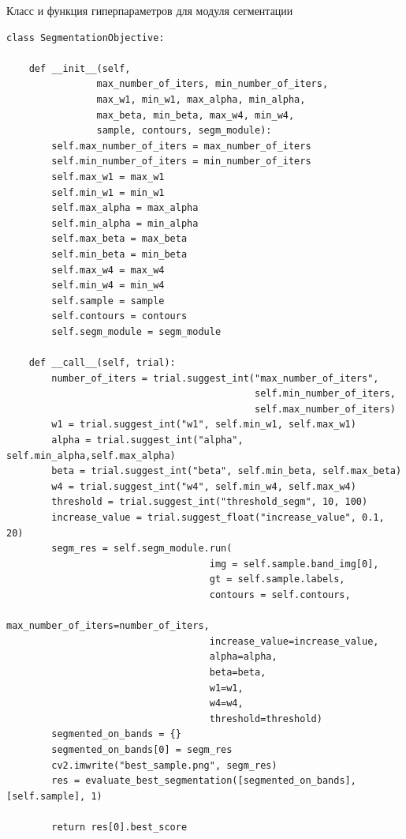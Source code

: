 \documentclass[14pt, russian]{scrartcl}
\begin{document}
\begin{listing}[H]
    \caption{Класс и функция гиперпараметров для модуля сегментации}
    \label{lst:contour_extr_sobel}
    \begin{verbatim}
class SegmentationObjective:

    def __init__(self,
                max_number_of_iters, min_number_of_iters,
                max_w1, min_w1, max_alpha, min_alpha,
                max_beta, min_beta, max_w4, min_w4,
                sample, contours, segm_module):
        self.max_number_of_iters = max_number_of_iters
        self.min_number_of_iters = min_number_of_iters
        self.max_w1 = max_w1
        self.min_w1 = min_w1
        self.max_alpha = max_alpha
        self.min_alpha = min_alpha
        self.max_beta = max_beta
        self.min_beta = min_beta
        self.max_w4 = max_w4
        self.min_w4 = min_w4
        self.sample = sample
        self.contours = contours
        self.segm_module = segm_module

    def __call__(self, trial):
        number_of_iters = trial.suggest_int("max_number_of_iters", 
                                            self.min_number_of_iters, 
                                            self.max_number_of_iters)
        w1 = trial.suggest_int("w1", self.min_w1, self.max_w1)
        alpha = trial.suggest_int("alpha", self.min_alpha,self.max_alpha)
        beta = trial.suggest_int("beta", self.min_beta, self.max_beta)
        w4 = trial.suggest_int("w4", self.min_w4, self.max_w4)
        threshold = trial.suggest_int("threshold_segm", 10, 100)
        increase_value = trial.suggest_float("increase_value", 0.1, 20)
        segm_res = self.segm_module.run(
                                    img = self.sample.band_img[0],
                                    gt = self.sample.labels,
                                    contours = self.contours,
                                    max_number_of_iters=number_of_iters,
                                    increase_value=increase_value,
                                    alpha=alpha,
                                    beta=beta,
                                    w1=w1,
                                    w4=w4,
                                    threshold=threshold)
        segmented_on_bands = {}
        segmented_on_bands[0] = segm_res
        cv2.imwrite("best_sample.png", segm_res)
        res = evaluate_best_segmentation([segmented_on_bands], [self.sample], 1)

        return res[0].best_score
    \end{verbatim}
\end{listing}
\end{document}
